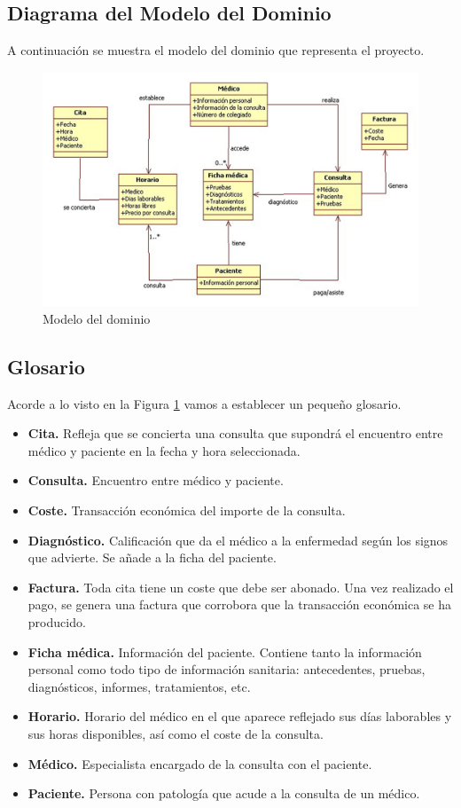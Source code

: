 \documentclass[a4paper,oneside,11pt]{book}
\begin{document}
\subsection{Diagrama del Modelo del Dominio}

A continuación se muestra el modelo del dominio que representa el proyecto.
\begin{figure}[H]
  \centering
    \includegraphics{img/modelo.jpg}
  \caption{Modelo del dominio}
  \label{modelodominio}
\end{figure}

\subsection{Glosario}
Acorde a lo visto en la Figura \ref{modelodominio} vamos a establecer un pequeño glosario.

\begin{itemize}
	\item \textbf{Cita.} Refleja que se concierta una consulta que supondrá el encuentro entre médico y paciente en la fecha y hora seleccionada. 
	\item \textbf{Consulta.} Encuentro entre médico y paciente.
	\item \textbf{Coste.} Transacción económica del importe de la consulta. 
	\item \textbf{Diagnóstico.} Calificación que da el médico a la enfermedad según los signos que advierte. Se añade a la ficha del paciente.
	\item \textbf{Factura.} Toda cita tiene un coste que debe ser abonado. Una vez realizado el pago, se genera una factura que corrobora que la transacción económica se ha producido.	
	\item \textbf{Ficha médica.} Información del paciente. Contiene tanto la información personal como todo tipo de información sanitaria: antecedentes, pruebas, diagnósticos, informes, tratamientos, etc.
	\item \textbf{Horario.} Horario del médico en el que aparece reflejado sus días laborables y sus horas disponibles, así como el coste de la consulta.
	\item \textbf{Médico.} Especialista encargado de la consulta con el paciente.
	\item \textbf{Paciente.} Persona con patología que acude a la consulta de un médico.
\end{itemize}
\end{document}

